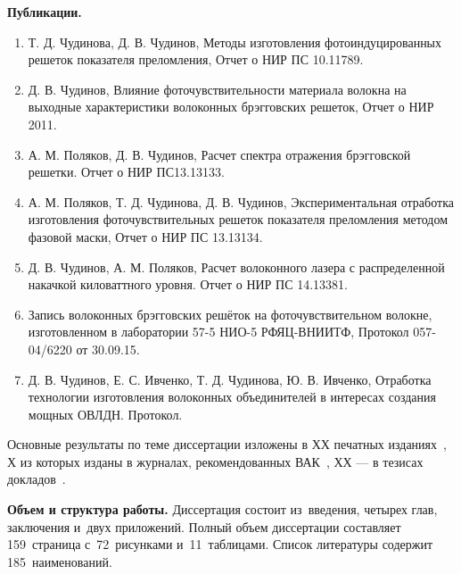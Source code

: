 
\textbf{Публикации.}

\begin{enumerate}
  \item Т. Д. Чудинова, Д. В. Чудинов, Методы изготовления фотоиндуцированных решеток показателя преломления, Отчет о НИР ПС 10.11789.
  \item Д. В. Чудинов, Влияние фоточувствительности материала волокна на выходные характеристики волоконных брэгговских решеток, Отчет о НИР 2011.
  \item А. М. Поляков, Д. В. Чудинов, Расчет спектра отражения брэгговской решетки. Отчет о НИР ПС13.13133.
  \item А. М. Поляков, Т. Д. Чудинова, Д. В. Чудинов, Экспериментальная отработка изготовления фоточувствительных решеток показателя преломления методом фазовой маски, Отчет о НИР ПС 13.13134.
  \item Д. В. Чудинов, А. М. Поляков, Расчет волоконного лазера с распределенной накачкой киловаттного уровня. Отчет о НИР ПС 14.13381.
  \item Запись волоконных брэгговских решёток на фоточувствительном волокне, изготовленном в лаборатории 57-5 НИО-5 РФЯЦ-ВНИИТФ, Протокол 057-04/6220 от 30.09.15.
  \item Д. В. Чудинов, Е. С. Ивченко, Т. Д. Чудинова, Ю. В. Ивченко, Отработка технологии изготовления волоконных объединителей в интересах создания мощных ОВЛДН. Протокол.
\end{enumerate}

Основные результаты по теме диссертации изложены в ХХ печатных изданиях~\cite{},
Х из которых изданы в журналах, рекомендованных ВАК~\cite{},
ХХ --- в тезисах докладов~\cite{}.

\textbf{Объем и структура работы.} Диссертация состоит из~введения, четырех глав, заключения и~двух приложений. Полный объем диссертации составляет 159~страница с~72~рисунками и~11~таблицами. Список литературы содержит 185~наименований.

\clearpage
